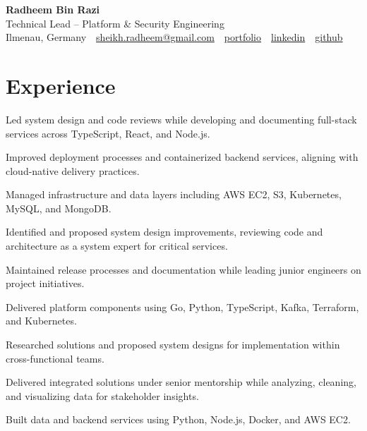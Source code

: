 \documentclass[11pt,a4paper]{resume}
\makeatletter
\newcommand{\Portfolio}{https://radheem.github.io/my-cv}
\newcommand{\PortfolioText}{portfolio}
\newcommand{\GitHub}{https://github.com/radheem}
\newcommand{\LinkedIn}{https://www.linkedin.com/in/radheem-razi}
\newcommand{\Email}{sheikh.radheem@gmail.com}
\makeatother
\begin{document}
\begin{center}
  {\huge\bfseries Radheem Bin Razi}\\[3pt]
  {\large Technical Lead – Platform \& Security Engineering}\\[6pt]
  \small
  Ilmenau, Germany \,\textbar\,
  \href{mailto:\Email}{\Email} \,\textbar\,
  \href{\Portfolio}{\PortfolioText} \,\textbar\,
  \href{\LinkedIn}{linkedin} \,\textbar\,
  \href{\GitHub}{github}
\end{center}
\vspace{2pt}

\section{Experience}

\bullets
  \item Led system design and code reviews while developing and documenting full-stack services across TypeScript, React, and Node.js.
  \item Improved deployment processes and containerized backend services, aligning with cloud-native delivery practices.
  \item Managed infrastructure and data layers including AWS EC2, S3, Kubernetes, MySQL, and MongoDB.
\bulletsend
\vspace{3pt}
\bullets
  \item Identified and proposed system design improvements, reviewing code and architecture as a system expert for critical services.
  \item Maintained release processes and documentation while leading junior engineers on project initiatives.
  \item Delivered platform components using Go, Python, TypeScript, Kafka, Terraform, and Kubernetes.
\bulletsend
\vspace{3pt}
\bullets
  \item Researched solutions and proposed system designs for implementation within cross-functional teams.
  \item Delivered integrated solutions under senior mentorship while analyzing, cleaning, and visualizing data for stakeholder insights.
  \item Built data and backend services using Python, Node.js, Docker, and AWS EC2.
\bulletsend
\vspace{3pt}
\end{document}
